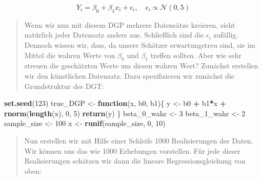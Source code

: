 \documentclass[]{book}
\newenvironment{Shaded}{\begin{snugshade}}{\end{snugshade}}
\newcommand{\KeywordTok}[1]{\textcolor[rgb]{0.13,0.29,0.53}{\textbf{#1}}}
\newcommand{\DecValTok}[1]{\textcolor[rgb]{0.00,0.00,0.81}{#1}}
\newcommand{\StringTok}[1]{\textcolor[rgb]{0.31,0.60,0.02}{#1}}
\newcommand{\ControlFlowTok}[1]{\textcolor[rgb]{0.13,0.29,0.53}{\textbf{#1}}}
\newcommand{\OperatorTok}[1]{\textcolor[rgb]{0.81,0.36,0.00}{\textbf{#1}}}
\newcommand{\NormalTok}[1]{#1}
\begin{document}
\[Y_i=\beta_0+\beta_1 x_i + \epsilon_i, \quad \epsilon_i\propto\mathcal{N}(0,5)\]

\begin{quote}
Wenn wir nun mit diesem DGP mehrere Datensätze kreieren, sieht natürlich
jeder Datensatz anders aus. Schließlich sind die \(\epsilon_i\)
zufällig. Dennoch wissen wir, dass, da unsere Schätzer erwartungstreu
sind, sie im Mittel die wahren Werte von \(\beta_0\) und \(\beta_1\)
treffen sollten. Aber wie sehr streuen die geschätzten Werte um diesen
wahren Wert? Zunächst erstellen wir den künstlichen Datensatz. Dazu
spezifizieren wir zunächst die Grundstruktur des DGT:
\end{quote}

\begin{Shaded}
\begin{Highlighting}[]
\KeywordTok{set.seed}\NormalTok{(}\DecValTok{123}\NormalTok{)}
\NormalTok{true_DGP <-}\StringTok{ }\ControlFlowTok{function}\NormalTok{(x, b0, b1)\{}
\NormalTok{  y <-}\StringTok{ }\NormalTok{b0 }\OperatorTok{+}\StringTok{ }\NormalTok{b1}\OperatorTok{*}\NormalTok{x }\OperatorTok{+}\StringTok{ }\KeywordTok{rnorm}\NormalTok{(}\KeywordTok{length}\NormalTok{(x), }\DecValTok{0}\NormalTok{, }\DecValTok{5}\NormalTok{)}
  \KeywordTok{return}\NormalTok{(y)}
\NormalTok{\}}
\NormalTok{beta_0_wahr <-}\StringTok{ }\DecValTok{3}
\NormalTok{beta_1_wahr <-}\StringTok{ }\DecValTok{2}
\NormalTok{sample_size <-}\StringTok{ }\DecValTok{100}
\NormalTok{x <-}\StringTok{ }\KeywordTok{runif}\NormalTok{(sample_size, }\DecValTok{0}\NormalTok{, }\DecValTok{10}\NormalTok{)}
\end{Highlighting}
\end{Shaded}

\begin{quote}
Nun erstellen wir mit Hilfe einer Schleife 1000 Realisierungen der
Daten. Wir können uns das wie 1000 Erhebungen vorstellen. Für jede
dieser Realisierungen schätzen wir dann die lineare Regressionsgleichung
von oben:
\end{quote}
\end{document}
